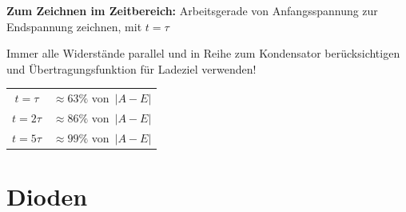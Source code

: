 \documentclass[a5paper, 12pt, twoside]{scrartcl}
\begin{document}
\textbf{Zum Zeichnen im Zeitbereich:} Arbeitsgerade von Anfangsspannung zur Endspannung zeichnen, mit \(t = \tau\)

 Immer alle Widerstände parallel und in Reihe zum Kondensator berücksichtigen und Übertragungsfunktion für Ladeziel verwenden!

\begin{table}[H]
  \centering
  \begin{tabular}{cc}
    \toprule
    \(t=\tau\) & \(\approx 63\%\) von\ \(|A-E|\)\\
    \(t=2\tau\) & \(\approx 86\%\) von\ \(|A-E|\)\\
    \(t=5\tau\) & \(\approx 99\%\) von\ \(|A-E|\)\\
    \bottomrule
  \end{tabular}
\end{table}

\section{Dioden}
\end{document}

